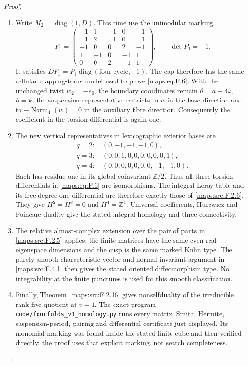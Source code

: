 \documentclass[11pt,a4paper]{article}
\theoremstyle{definition}
\begin{document}
\begin{proof}
\begin{enumerate}[label=\arabic*.]
\item Write $M_2=\operatorname{diag}(1,D)$.  This time use the
unimodular marking
\[
 P_1=\begin{pmatrix}
 -1&1&-1&0&-1\\
 -1&2&-1&0&-1\\
 -1&0&0&2&-1\\
 1&-1&0&-1&1\\
 0&0&2&-1&1
 \end{pmatrix},\qquad \det P_1=-1.
\]
It satisfies $DP_1=P_1\operatorname{diag}(\text{four-cycle},-1)$.
The cap therefore has the same cellular mapping-torus model
used to prove \eqref{maps:eq:F.6}.  With the unchanged twist $w_2=-e_0$,
the boundary coordinates remain $\theta=a+4k$, $h=k$;
the suspension representative restricts to $w$ in the base
direction and to $-\operatorname{Norm}_4(w)=0$ in the
auxiliary fibre direction.  Consequently the coefficient in
the torsion differential is again one.

\item The new vertical representatives in lexicographic exterior
bases are
\[
\begin{split}
 q=2:\ &(0,-1,-1,-1,0),\\
 q=3:\ &(0,0,1,0,0,0,0,0,0,1),\\
 q=4:\ &(0,0,0,0,0,0,0,-1,-1,0).
\end{split}
\]
Each has residue one in its global coinvariant
$\mathbb Z/2$.  Thus all three torsion differentials in \eqref{maps:eq:F.6}
are isomorphisms.  The integral Leray table and its free
degree-one differential are therefore exactly those of
\ref{maps:src:F.2.6}.  They give $H^2=H^3=0$ and $H^4=\mathbb Z^4$.
Universal coefficients, Hurewicz and Poincare duality give
the stated integral homology and three-connectivity.

\item The relative almost-complex extension over the pair of pants
in \ref{maps:src:F.2.5} applies: the finite matrices have the same even
real eigenspace dimensions and the cusp is the same marked
Kuhn type.  The purely smooth characteristic-vector and
normal-invariant argument in \ref{maps:src:F.4.1} then gives the stated
oriented diffeomorphism type.  No integrability at the finite
punctures is used for this smooth classification.

\item Finally, Theorem~\ref{maps:src:F.2.16} gives nonselfduality of the irreducible rank-five quotient at $v=1$.
The exact program
\texttt{code/fourfolds\_v1\_homology.py} runs every matrix,
Smith, Hermite, suspension-period, pairing and differential
certificate just displayed.  Its monomial marking was found
inside the stated finite cube and then verified directly;
the proof uses that explicit marking, not search completeness.

\end{enumerate}
\end{proof}
\end{document}
